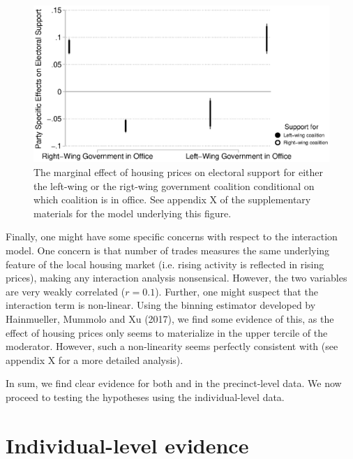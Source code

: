 \documentclass[12pt,a4paper]{article}
\begin{document}
	\begin{figure}
		\includegraphics[width=1\textwidth]{../figures/partyspecific.eps}
		\caption{The marginal effect of housing prices on electoral support for either the left-wing or the rigt-wing government coalition conditional on which coalition is in office. See appendix X of the supplementary materials for the model underlying this figure.}
		\label {partyspecific}
	\end{figure}
	
	Finally, one might have some specific concerns with respect to the interaction model. One concern is that number of trades measures the same underlying feature of the local housing market (i.e. rising activity is reflected in rising prices), making any interaction analysis nonsensical. However, the two variables are very weakly correlated ($r=0.1$). Further, one might suspect that the interaction term is non-linear. Using the binning estimator developed  by Hainmueller, Mummolo and Xu (2017), we find some evidence of this, as the effect of housing prices only seems to materialize in the upper tercile of the moderator. However, such a non-linearity seems perfectly consistent with \htwo  (see appendix X for a more detailed analysis). 
	
	In sum, we find clear evidence for both \hone and \htwo in the precinct-level data. We now proceed to testing the hypotheses using the individual-level data.
	
	\section{Individual-level evidence}
	
\end{document}
